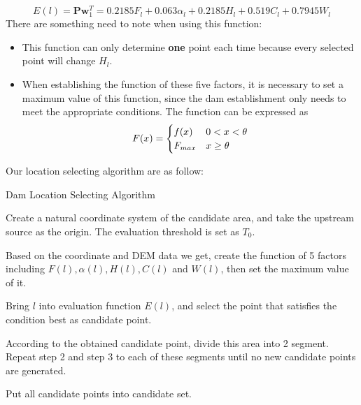 \documentclass{mcmthesis}
\begin{document}
\begin{equation}
E(l) = \textbf{P}\textbf{w}_{1}^{T} = 0.2185F_l + 0.063{\alpha}_{l} + 0.2185H_l + 0.519C_l + 0.7945W_l
\end{equation}
There are something need to note when using this function:
\begin{itemize}
  \item This function can only determine \textbf{one} point each time because every selected point will change $H_l$.
  \item When establishing the function of these five factors, it is necessary to set a maximum value of this function, since the dam establishment only needs to meet the appropriate conditions. The function can be expressed as 
  \begin{eqnarray}
  F(x) =
  \begin{cases}
  f(x) & 0 < x < \theta \cr F_{max} & x \ge \theta
  \end{cases}
  \end{eqnarray}
\end{itemize}
Our location selecting algorithm are as follow:

\begin{framed}
\begin{list}{.}
    {\setlength{\parsep}{0ex}\setlength{\itemsep}{0ex}}
\item[] Dam Location Selecting Algorithm
\item Create a natural coordinate system of the candidate area, and take the upstream source as the origin. The evaluation threshold is set as $T_{0}$.
\item Based on the coordinate and DEM data we get, create the function of 5 factors including $F(l),\alpha(l),H(l),C(l)$ and $W(l)$, then set the maximum value of it.
\item Bring $l$ into evaluation function $E(l)$, and select the point that satisfies the condition best as candidate point.
\item According to the obtained candidate point, divide this area into 2 segment. Repeat step 2 and step 3 to each of these segments until no new candidate points are generated.
\item Put all candidate points into candidate set.
\end{list}
\end{framed}
\end{document}
